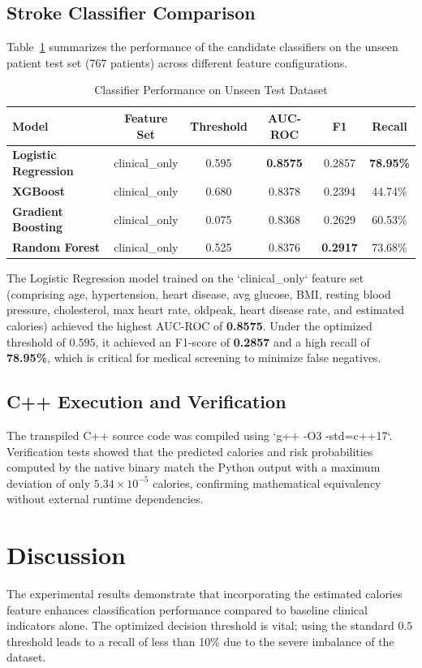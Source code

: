 \documentclass[11pt,letterpaper]{article}
\begin{document}
\subsection{Stroke Classifier Comparison}
Table~\ref{tab:results} summarizes the performance of the candidate classifiers on the unseen patient test set (767 patients) across different feature configurations.

\begin{table}[h]
\centering
\caption{Classifier Performance on Unseen Test Dataset}
\label{tab:results}
\begin{tabular}{lccccc}
\toprule
\textbf{Model} & \textbf{Feature Set} & \textbf{Threshold} & \textbf{AUC-ROC} & \textbf{F1} & \textbf{Recall} \\
\midrule
\textbf{Logistic Regression} & clinical\_only & 0.595 & \textbf{0.8575} & 0.2857 & \textbf{78.95\%} \\
\textbf{XGBoost} & clinical\_only & 0.680 & 0.8378 & 0.2394 & 44.74\% \\
\textbf{Gradient Boosting} & clinical\_only & 0.075 & 0.8368 & 0.2629 & 60.53\% \\
\textbf{Random Forest} & clinical\_only & 0.525 & 0.8376 & \textbf{0.2917} & 73.68\% \\
\bottomrule
\end{tabular}
\end{table}

The Logistic Regression model trained on the `clinical\_only` feature set (comprising age, hypertension, heart disease, avg glucose, BMI, resting blood pressure, cholesterol, max heart rate, oldpeak, heart disease rate, and estimated calories) achieved the highest AUC-ROC of \textbf{0.8575}. Under the optimized threshold of $0.595$, it achieved an F1-score of \textbf{0.2857} and a high recall of \textbf{78.95\%}, which is critical for medical screening to minimize false negatives.

\subsection{C++ Execution and Verification}
The transpiled C++ source code was compiled using `g++ -O3 -std=c++17`. Verification tests showed that the predicted calories and risk probabilities computed by the native binary match the Python output with a maximum deviation of only $5.34 \times 10^{-5}$ calories, confirming mathematical equivalency without external runtime dependencies.

\section{Discussion}
The experimental results demonstrate that incorporating the estimated calories feature enhances classification performance compared to baseline clinical indicators alone. The optimized decision threshold is vital; using the standard $0.5$ threshold leads to a recall of less than 10\% due to the severe imbalance of the dataset.
\end{document}
